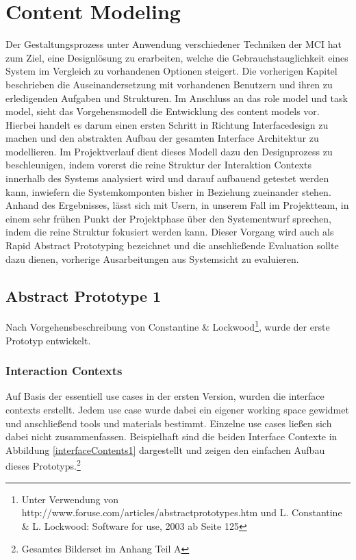 
\section{Content Modeling}
Der Gestaltungsprozess unter Anwendung verschiedener Techniken der MCI hat zum Ziel, eine Designlösung zu erarbeiten, welche die Gebrauchstauglichkeit eines System im Vergleich zu vorhandenen Optionen steigert. Die vorherigen Kapitel beschrieben die Auseinandersetzung mit vorhandenen Benutzern und ihren zu erledigenden Aufgaben und Strukturen. Im Anschluss an das role model und task model, sieht das Vorgehensmodell die Entwicklung des content models vor.
Hierbei handelt es darum einen ersten Schritt in Richtung Interfacedesign zu machen und den abstrakten Aufbau der gesamten  Interface Architektur zu modellieren. Im Projektverlauf dient dieses Modell dazu den Designprozess zu beschleunigen, indem vorerst die reine Struktur der Interaktion Contexts innerhalb des Systems analysiert wird und darauf aufbauend getestet werden kann, inwiefern die Systemkomponten bisher in Beziehung zueinander stehen.
Anhand des Ergebnisses, lässt sich mit Usern, in unserem Fall im Projektteam, in einem sehr frühen Punkt der Projektphase über den Systementwurf sprechen, indem die reine Struktur fokusiert werden kann. Dieser Vorgang wird auch als Rapid Abstract Prototyping bezeichnet und die anschließende Evaluation sollte dazu dienen, vorherige Ausarbeitungen aus Systemsicht zu evaluieren.

\newpage
\subsection{Abstract Prototype 1}
Nach Vorgehensbeschreibung von Constantine \& Lockwood\footnote{Unter Verwendung von http://www.foruse.com/articles/abstractprototypes.htm und L. Constantine \& L. Lockwood: Software for use, 2003 ab Seite 125}, wurde der erste Prototyp entwickelt. 

\subsubsection{Interaction Contexts }
Auf Basis der essentiell use cases in der ersten Version, wurden die interface contexts erstellt. Jedem use case wurde dabei ein eigener working space gewidmet und anschließend tools und materials bestimmt. Einzelne use cases ließen sich dabei nicht zusammenfassen.
Beispielhaft sind die beiden Interface Contexte in Abbildung \ref{interfaceContents1} dargestellt und zeigen den einfachen Aufbau dieses Prototyps.\footnote{Gesamtes Bilderset im Anhang Teil A}

